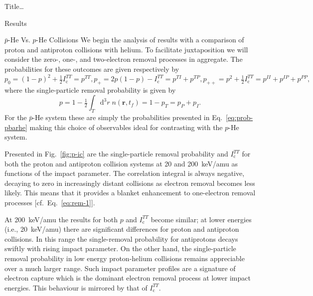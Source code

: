 \documentclass[letterpaper, 10 pt]{report}
\begin{document}
\begin{chapter}{ Title\dots \label{chap:p-he2p-he}}
\begin{section}{Results \label{sec:phe2p-res}}
\begin{subsection}{ \texorpdfstring{$\bar{p}$}{pbar}-He Vs. \texorpdfstring{$p$}{p}-He Collisions
                         \label{sec:pbarhe-res}}
         We begin the analysis of results with a comparison of proton and antiproton collisions with
         helium. To facilitate juxtaposition we will consider the zero-, one-, and two-electron removal
         processes in aggregate. The probabilities for these outcomes are given respectively by
         \begin{subequations} \label{eq:remove}
            \begin{equation} \label{eq:rem-0}
               p_0 = (1 - p)^2 + \tfrac{1}{2} I^{TT}_\mathrm{c} = p^{TT},
            \end{equation}
            \begin{equation} \label{eq:rem-1}
               p_+ = 2 p (1-p) - I^{TT}_\mathrm{c} = p^{TI} + p^{TP},
            \end{equation}
            \begin{equation} \label{eq:rem-2}
               p_{++} = p^2 + \tfrac{1}{2} I^{TT}_\mathrm{c} = p^{II} + p^{IP} + p^{PP},
            \end{equation}
         \end{subequations}
         where the single-particle removal probability is given by
         \begin{equation} \label{eq:p-rem}
            p = 1 - \tfrac{1}{2} \int_T \mathrm{d}^3 r \; n(\mathbf{r},t_f)
            = 1 - p_T = p_P + p_I.
         \end{equation}
         For the $\bar{p}$-He system these are simply the probabilities presented in
         Eq.~\eqref{eq:prob-pbarhe} making this choice of observables ideal for contrasting with the
         $p$-He system.

         Presented in Fig.~\ref{fig:p-ic} are the single-particle removal probability and
         $I^{TT}_\mathrm{c}$ for both the proton and antiproton collision systems at 20 and 200~keV/amu
         as functions of the impact parameter. The correlation integral is always negative, decaying to
         zero in increasingly distant collisions as electron removal becomes less likely. This means
         that it provides a blanket enhancement to one-electron removal processes
         [cf.\ Eq.~\eqref{eq:rem-1}]. 

         At 200~keV/amu the results for both $p$ and $I^{TT}_\mathrm{c}$ become similar; at lower
         energies (i.e., 20~keV/amu) there are significant differences for proton and antiproton
         collisions. In this range the single-removal probability for antiprotons decays swiftly with
         rising impact parameter. On the other hand, the single-particle removal probability in low
         energy proton-helium collisions remains appreciable over a much larger range. Such impact
         parameter profiles are a signature of electron capture which is the dominant electron removal
         process at lower impact energies. This behaviour is mirrored by that of $I^{TT}_\mathrm{c}$.


\end{subsection}
\end{section}
\end{chapter}
\end{document}
